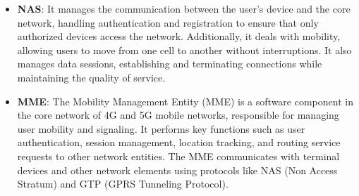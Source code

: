 \documentclass[english]{article}
\begin{document}
\begin{itemize}
	\item \textbf{\hypertarget{NAS}{NAS}}:
	      It manages the communication between the user's device and the core network,
	      handling authentication and registration to ensure that only authorized devices
	      access the network. Additionally, it deals with mobility, allowing users to move from
	      one cell to another without interruptions. It also manages data sessions, establishing
	      and terminating connections while maintaining the quality of service.

	\item \textbf{\hypertarget{MME}{MME}}:
	      The Mobility Management Entity (MME) is a software component in the core network of 4G
	      and 5G mobile networks, responsible for managing user mobility and signaling.
	      It performs key functions such as user authentication, session management, location tracking,
	      and routing service requests to other network entities. The MME communicates with terminal
	      devices and other network elements using protocols like NAS (Non Access Stratum) and GTP
	      (GPRS Tunneling Protocol).
\end{itemize}
\clearpage
\printbibliography
\end{document}
